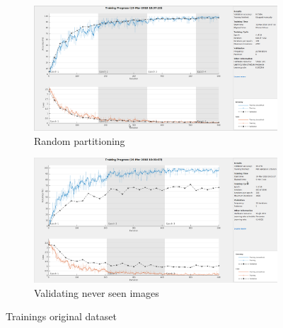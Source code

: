 \documentclass[]{article}
\begin{document}
\begin{figure}[h]
	\centering
	\begin{subfigure}[b]{0.49\textwidth}
		\includegraphics[width=\textwidth]{google_regular_training.png}
		\caption{Random partitioning}
	\end{subfigure}
	\begin{subfigure}[b]{0.5\textwidth}
		\includegraphics[width=\textwidth]{google_ric_validation.png}
		\caption{Validating never seen images}
	\end{subfigure}
	
	\caption{Trainings original dataset}
\end{figure}
\end{document}
